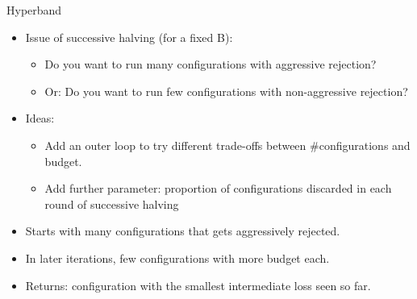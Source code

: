 \begin{frame}{Hyperband}
\begin{itemize}
    \item Issue of successive halving (for a fixed B):
    \begin{itemize}
        \item Do you want to run many configurations with aggressive rejection?
        \item Or: Do you want to run few configurations with non-aggressive rejection?
    \end{itemize}
    \item Ideas:
    \begin{itemize}
        \item Add an outer loop to try different trade-offs between $\#$configurations and budget.
        \item Add further parameter: proportion of configurations discarded in each round of successive halving
    \end{itemize}
    \item Starts with many configurations that gets aggressively rejected.
    \item In later iterations, few configurations with more budget each.
    \item Returns: configuration with the smallest intermediate loss seen so far.
\end{itemize}
\end{frame}


